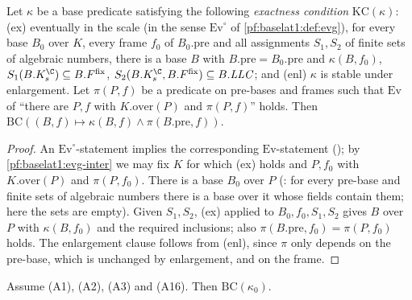\begin{proposition}\label{pf:baselat1:baseCondOf}
Let $\kappa$ be a base predicate satisfying the following \emph{exactness condition} $\mathrm{KC}(\kappa)$: (ex)
eventually in the scale (in the sense $\mathrm{Ev}^{\circ}$ of \cref{pf:baselat1:def:evg}), for every base
$B_0$ over $K$, every frame $f_0$ of $B_0.\mathrm{pre}$ and all assignments $S_1,S_2$ of finite sets of
algebraic numbers, there is a base $B$ with $B.\mathrm{pre}=B_0.\mathrm{pre}$ and $\kappa(B,f_0)$,
$S_1(B.K_s^{\C})\subseteq B.F^{\mathrm{fix}}$, $S_2(B.K_s^{\C},B.F^{\mathrm{fix}})\subseteq B.\mathit{LLC}$; and
(enl) $\kappa$ is stable under enlargement. Let $\pi(P,f)$ be a predicate on pre-bases and frames such that
$\mathrm{Ev}$ of ``there are $P,f$ with $K.\mathrm{over}(P)$ and $\pi(P,f)$'' holds. Then
$\mathrm{BC}((B,f)\mapsto\kappa(B,f)\wedge\pi(B.\mathrm{pre},f))$.
\end{proposition}

\begin{proof}
An $\mathrm{Ev}^{\circ}$-statement implies the corresponding $\mathrm{Ev}$-statement
(); by \cref{pf:baselat1:evg-inter} we may fix $K$ for which (ex)
holds and $P,f_0$ with $K.\mathrm{over}(P)$ and $\pi(P,f_0)$. There is a base $B_0$ over $P$
(: for every pre-base and finite sets of algebraic numbers
there is a base over it whose fields contain them; here the sets are empty). Given $S_1,S_2$, (ex) applied to
$B_0,f_0,S_1,S_2$ gives $B$ over $P$ with $\kappa(B,f_0)$ and the required inclusions; also
$\pi(B.\mathrm{pre},f_0)=\pi(P,f_0)$ holds. The enlargement clause follows from (enl), since $\pi$ only
depends on the pre-base, which is unchanged by enlargement, and on the frame.
\end{proof}

\begin{proposition}\label{pf:baselat1:baseCond}
Assume (A1), (A2), (A3) and
(A16). Then $\mathrm{BC}(\kappa_0)$.
\end{proposition}

